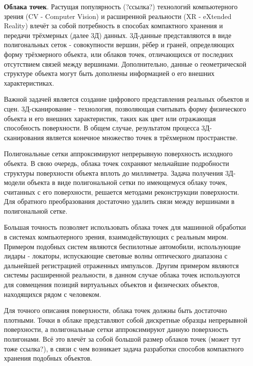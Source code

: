 \textbf{Облака точек}. Растущая популярность (?ссылка?) технологий компьютерного
зрения (CV - Computer Vision) и расширенной реальности (XR - eXtended Reality)
влечёт за собой потребность в способах компактного хранения и передачи
трёхмерных (далее 3Д) данных. 3Д-данные представляются в виде полигональных
сеток - совокупности вершин, рёбер и граней, определяющих форму трёхмерного
объекта, или облаков точек, отличающихся от последних отсутствием связей между
вершинами. Дополнительно, данные о геометрической структуре объекта могут быть
дополнены информацией о его внешних характеристиках.

Важной задачей является создание цифрового представления реальных объектов и
сцен. 3Д-сканирование - технология, позволяющая считывать форму физического
объекта и его внешних характеристик, таких как цвет или отражающая способность
поверхности. В общем случае, результатом процесса 3Д-сканирования является
конечное множество точек в трёхмерном
пространстве\cite[10]{SurfaceReconstruction}.

Полигональные сетки аппроксимируют непрерывную поверхность исходного объекта. В
свою очередь, облака точек сохраняют мельчайшие подробности структуры
поверхности объекта вплоть до миллиметра\cite[33]{SurfaceReconstruction}. Задача
получения 3Д-модели объекта в виде полигональной сетки по имеющемуся облаку
точек, считанных с его поверхности, решается методами реконструкции
поверхности\cite{SurfaceReconstruction}. Для обратного преобразования достаточно
удалить связи между вершинами в полигональной сетке.

Большая точность позволяет использовать облака точек для машинной обработки в
системах компьютерного зрения, взаимодействующих с реальным миром. Примером
подобных систем являются беспилотные автомобили, использующие лидары - локаторы,
испускающие световые волны оптического диапазона с дальнейшей регистрацией
отраженных импульсов\cite[7]{PointCloudAnalysis}. Другим примером являются
системы расширенной реальности, в данном случае облака точек используются для
совмещения позиций виртуальных объектов и физических объектов, находящихся рядом
с человеком\cite[15]{PointCloudAnalysis}.

Для точного описания поверхности, облака точек должны быть достаточно плотными.
Точки в облаке представляют собой дискретные образцы непрерывной поверхности, а
полигональные сетки аппроксимируют данную поверхность
полигонами\cite[4]{PointCloudAnalysis}. Всё это влечёт за собой большой размер
облаков точек (может тут тоже ссылка?), в связи с чем возникает задача
разработки способов компактного хранения подобных объектов.

